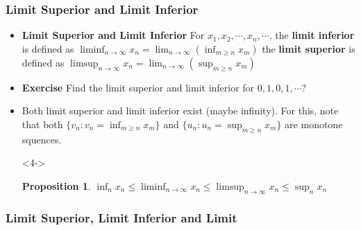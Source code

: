 \documentclass[handout]{beamer}
\newtheorem{Proposition}[theorem]{Proposition}
\begin{document}
\frame
{
  \frametitle{Limit Superior and Limit Inferior}

   \begin{itemize}
  \item<1-> \textbf{Limit Superior and Limit Inferior} For $x_1,x_2,\cdots,x_n,\cdots $, the \textbf{limit inferior} is defined as $\liminf_{n\rightarrow \infty} x_n=\lim_{n\rightarrow \infty} (\inf_{m\geq n} x_m)$  the  \textbf{limit superior} is defined as $\limsup_{n\rightarrow \infty} x_n=\lim_{n\rightarrow \infty} (\sup_{m\geq n} x_m)$
  
      \item<2-> \textbf{Exercise} Find the limit superior and limit inferior for $0,1,0,1,\cdots$?
  
    \item<3-> Both limit superior and limit inferior exist (maybe infinity). For this, note that both $\{v_n: v_n=\inf_{m\geq n} x_m\}$ and $\{u_n: u_n=\sup_{m\geq n} x_m\}$ are monotone squences. 
      
   \item[]<4-> \begin{Proposition}  $\inf_{n} x_n \leq \liminf_{n\rightarrow \infty} x_n\leq \limsup_{n\rightarrow \infty} x_n\leq \sup_{n} x_n$\end{Proposition} 
   

  \end{itemize}
}

\subsubsection{Limit Superior, Limit Inferior and Limit}
\end{document}
